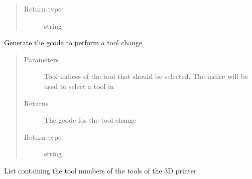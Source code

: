 \documentclass[letterpaper,10pt,english]{sphinxmanual}
\begin{document}
\begin{fulllineitems}
\begin{fulllineitems}
\begin{quote}
\begin{description}
\item[{Return type}] \leavevmode
\sphinxAtStartPar
string

\end{description}\end{quote}

\end{fulllineitems}


\begin{fulllineitems}
\label{\detokenize{index:generator.generator.tool_change}}
\sphinxAtStartPar
Generate the gcode to perform a tool change
\begin{quote}\begin{description}
\item[{Parameters}] \leavevmode
\sphinxAtStartPar
{} \textendash{} Tool indices of the tool that should be selected. The indice will be used to select a tool in {\hyperref[\detokenize{index:generator.generator.tools}]{}}

\item[{Returns}] \leavevmode
\sphinxAtStartPar
The gcode for the tool change

\item[{Return type}] \leavevmode
\sphinxAtStartPar
string

\end{description}\end{quote}

\end{fulllineitems}


\begin{fulllineitems}
\label{\detokenize{index:generator.generator.tools}}
\sphinxAtStartPar
List containing the tool numbers of the tools of the 3D printer

\end{fulllineitems}



\end{fulllineitems}
\end{document}
